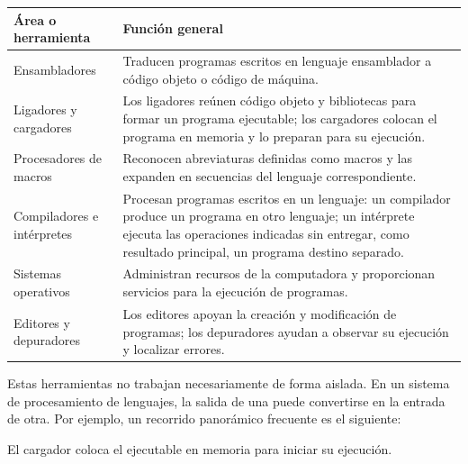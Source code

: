 \documentclass[11pt,spanish]{article}
\providecommand{\tabularnewline}{\\}
\begin{document}
\begin{center}
\renewcommand{\arraystretch}{1.25}
\begin{tabular}{|p{}|p{}|}
\hline
\textbf{Área o herramienta} & \textbf{Función general} \tabularnewline
\hline
Ensambladores & Traducen programas escritos en lenguaje ensamblador a código objeto o código de máquina. \tabularnewline
\hline
Ligadores y cargadores & Los ligadores reúnen código objeto y bibliotecas para formar un programa ejecutable; los cargadores colocan el programa en memoria y lo preparan para su ejecución. \tabularnewline
\hline
Procesadores de macros & Reconocen abreviaturas definidas como macros y las expanden en secuencias del lenguaje correspondiente. \tabularnewline
\hline
Compiladores e intérpretes & Procesan programas escritos en un lenguaje: un compilador produce un programa en otro lenguaje; un intérprete ejecuta las operaciones indicadas sin entregar, como resultado principal, un programa destino separado. \tabularnewline
\hline
Sistemas operativos & Administran recursos de la computadora y proporcionan servicios para la ejecución de programas. \tabularnewline
\hline
Editores y depuradores & Los editores apoyan la creación y modificación de programas; los depuradores ayudan a observar su ejecución y localizar errores. \tabularnewline
\hline
\end{tabular}
\end{center}

Estas herramientas no trabajan necesariamente de forma aislada. En un sistema de procesamiento de lenguajes, la salida de una puede convertirse en la entrada de otra. Por ejemplo, un recorrido panorámico frecuente es el siguiente:

\begin{center}

\vspace{0.4em}
\small El cargador coloca el ejecutable en memoria para iniciar su ejecución.
\end{center}
\end{document}

